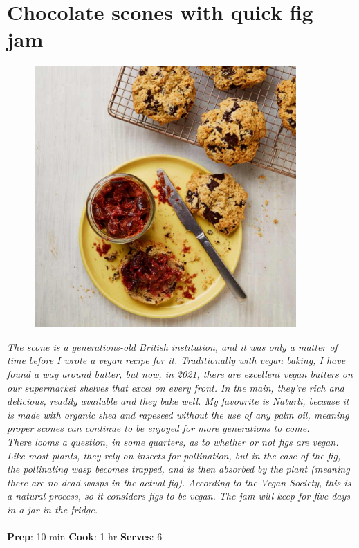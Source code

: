 \documentclass{book}
\begin{document}
\section{Chocolate scones with quick fig jam}
\begin{figure}
\centering\includegraphics[width=10cm,height=10cm,keepaspectratio]{Recipe_Pictures/Chocolate_scones_with_quick_fig_jam.png}
\end{figure}
\emph{The scone is a generations-old British institution, and it was only a matter of time before I wrote a vegan recipe for it. Traditionally with vegan baking, I have found a way around butter, but now, in 2021, there are excellent vegan butters on our supermarket shelves that excel on every front. In the main, they’re rich and delicious, readily available and they bake well. My favourite is Naturli, because it is made with organic shea and rapeseed without the use of any palm oil, meaning proper scones can continue to be enjoyed for more generations to come.\\ 
There looms a question, in some quarters, as to whether or not figs are vegan. Like most plants, they rely on insects for pollination, but in the case of the fig, the pollinating wasp becomes trapped, and is then absorbed by the plant (meaning there are no dead wasps in the actual fig). According to the Vegan Society, this is a natural process, so it considers figs to be vegan. The jam will keep for five days in a jar in the fridge.}\\\\ 
\textbf{Prep}: 10 min
\textbf{Cook}: 1 hr
\textbf{Serves}: 6
\end{document}

